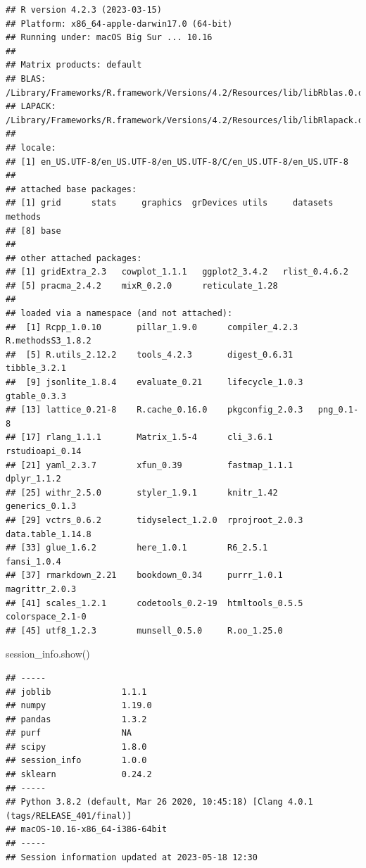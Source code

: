 \documentclass[
  11pt,
  oneside]{book}
\newenvironment{Shaded}{\begin{snugshade}}{\end{snugshade}}
\newcommand{\NormalTok}[1]{#1}
\begin{document}
\begin{verbatim}
## R version 4.2.3 (2023-03-15)
## Platform: x86_64-apple-darwin17.0 (64-bit)
## Running under: macOS Big Sur ... 10.16
## 
## Matrix products: default
## BLAS:   /Library/Frameworks/R.framework/Versions/4.2/Resources/lib/libRblas.0.dylib
## LAPACK: /Library/Frameworks/R.framework/Versions/4.2/Resources/lib/libRlapack.dylib
## 
## locale:
## [1] en_US.UTF-8/en_US.UTF-8/en_US.UTF-8/C/en_US.UTF-8/en_US.UTF-8
## 
## attached base packages:
## [1] grid      stats     graphics  grDevices utils     datasets  methods  
## [8] base     
## 
## other attached packages:
## [1] gridExtra_2.3   cowplot_1.1.1   ggplot2_3.4.2   rlist_0.4.6.2  
## [5] pracma_2.4.2    mixR_0.2.0      reticulate_1.28
## 
## loaded via a namespace (and not attached):
##  [1] Rcpp_1.0.10       pillar_1.9.0      compiler_4.2.3    R.methodsS3_1.8.2
##  [5] R.utils_2.12.2    tools_4.2.3       digest_0.6.31     tibble_3.2.1     
##  [9] jsonlite_1.8.4    evaluate_0.21     lifecycle_1.0.3   gtable_0.3.3     
## [13] lattice_0.21-8    R.cache_0.16.0    pkgconfig_2.0.3   png_0.1-8        
## [17] rlang_1.1.1       Matrix_1.5-4      cli_3.6.1         rstudioapi_0.14  
## [21] yaml_2.3.7        xfun_0.39         fastmap_1.1.1     dplyr_1.1.2      
## [25] withr_2.5.0       styler_1.9.1      knitr_1.42        generics_0.1.3   
## [29] vctrs_0.6.2       tidyselect_1.2.0  rprojroot_2.0.3   data.table_1.14.8
## [33] glue_1.6.2        here_1.0.1        R6_2.5.1          fansi_1.0.4      
## [37] rmarkdown_2.21    bookdown_0.34     purrr_1.0.1       magrittr_2.0.3   
## [41] scales_1.2.1      codetools_0.2-19  htmltools_0.5.5   colorspace_2.1-0 
## [45] utf8_1.2.3        munsell_0.5.0     R.oo_1.25.0
\end{verbatim}

\begin{Shaded}
\begin{Highlighting}[]
\NormalTok{session\_info.show()}
\end{Highlighting}
\end{Shaded}

\begin{verbatim}
## -----
## joblib              1.1.1
## numpy               1.19.0
## pandas              1.3.2
## purf                NA
## scipy               1.8.0
## session_info        1.0.0
## sklearn             0.24.2
## -----
## Python 3.8.2 (default, Mar 26 2020, 10:45:18) [Clang 4.0.1 (tags/RELEASE_401/final)]
## macOS-10.16-x86_64-i386-64bit
## -----
## Session information updated at 2023-05-18 12:30
\end{verbatim}
\end{document}
